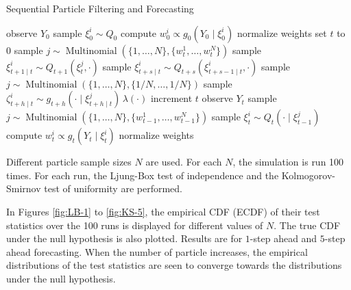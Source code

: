 \documentclass{article}
\begin{document}
\begin{algorithm}
\caption{Sequential Particle Filtering and Forecasting}
\label{algo:filter-forecast}
\begin{algorithmic}
    \State observe $Y_0$
     
        \State sample $\xi^i_0 \sim Q_0$
        \State compute $w^i_0 \propto g_0(Y_0 \mid \xi^i_0)$
    \EndFor
    \State normalize weights
    \State set $t$ to 0
    \Loop
         
            \State sample $j \sim \operatorname{Multinomial}(\{1,\dots,N\}, \{w^1_t,\dots,w^N_t\})$
            \State sample $\xi^i_{t+1 \mid t} \sim Q_{t+1}(\xi^j_t,\cdot)$
                \State sample $\xi^i_{t+s \mid t} \sim Q_{t+s}(\xi^i_{t+s-1 \mid t},\cdot)$
            \EndFor
        \EndFor
            \State sample $j \sim \operatorname{Multinomial}(\{1,\dots,N\}, \{1/N,\dots,1/N\})$
            \State sample $\zeta^i_{t+h \mid t} \sim g_{t+h}(\cdot \mid \xi^j_{t+h \mid t}) \, \lambda(\cdot)$
        \EndFor
        \State increment $t$
        \State observe $Y_t$
         
            \State sample $j \sim \operatorname{Multinomial}(\{1,\dots,N\}, \{w^1_{t-1},\dots,w^N_{t-1}\})$
            \State sample $\xi^i_t \sim Q_t(\cdot \mid \xi^j_{t-1})$
            \State compute $w^i_t \propto g_t(Y_t \mid \xi^i_t)$
        \EndFor
        \State normalize weights
    \EndLoop
\end{algorithmic}
\end{algorithm}

Different particle sample sizes $N$ are used. For each $N$, the simulation is run 100 times. For each run, the Ljung-Box test of independence and the Kolmogorov-Smirnov test of uniformity are performed.

In Figures \ref{fig:LB-1} to \ref{fig:KS-5}, the empirical CDF (ECDF) of their test statistics over the 100 runs is displayed for different values of $N$. The true CDF under the null hypothesis is also plotted. Results are for $1$-step ahead and $5$-step ahead forecasting. When the number of particle increases, the empirical distributions of the test statistics are seen to converge towards the distributions under the null hypothesis. 
\end{document}
